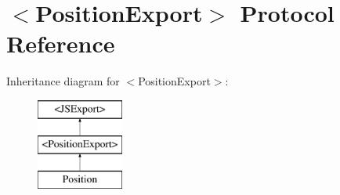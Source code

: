 \hypertarget{protocol_position_export-p}{}\section{$<$Position\+Export$>$ Protocol Reference}
\label{protocol_position_export-p}
Inheritance diagram for $<$Position\+Export$>$\+:\begin{figure}[H]
\begin{center}
\leavevmode
\includegraphics[height=3.000000cm]{protocol_position_export-p}
\end{center}
\end{figure}
